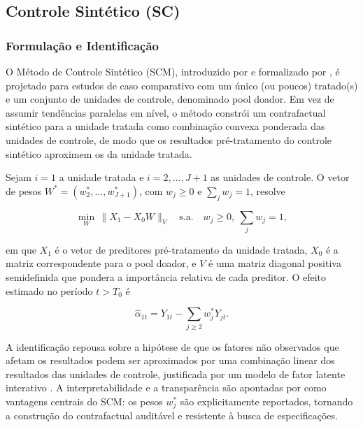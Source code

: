 \documentclass[a4paper,12pt]{article}
\begin{document}
\subsection{Controle Sintético (SC)}

\subsubsection{Formulação e Identificação}

O Método de Controle Sintético (SCM), introduzido por  e
formalizado por , é projetado para estudos de caso
comparativo com um único (ou poucos) tratado(s) e um conjunto de unidades de controle,
denominado pool doador. Em vez de assumir tendências paralelas em nível, o método constrói
um contrafactual sintético para a unidade tratada como combinação convexa ponderada das
unidades de controle, de modo que os resultados pré-tratamento do controle sintético
aproximem os da unidade tratada.

Sejam $i = 1$ a unidade tratada e $i = 2, \dots, J+1$ as unidades de controle. O vetor de
pesos $W^* = (w^*_2, \dots, w^*_{J+1})$, com $w_j \ge 0$ e $\sum_j w_j = 1$, resolve

\begin{equation}
\min_{W}\, \| X_1 - X_0 W \|_V \quad \text{s.a.} \quad w_j \geq 0,\ \sum_j w_j = 1,
\end{equation}

em que $X_1$ é o vetor de preditores pré-tratamento da unidade tratada, $X_0$ é a matriz
correspondente para o pool doador, e $V$ é uma matriz diagonal positiva
semidefinida que pondera a importância relativa de cada preditor. O efeito estimado no
período $t > T_0$ é

\begin{equation}
\hat{\alpha}_{1t} = Y_{1t} - \sum_{j \ge 2} w^*_j Y_{jt}.
\end{equation}

A identificação repousa sobre a hipótese de que os fatores não observados que afetam os
resultados podem ser aproximados por uma combinação linear dos resultados das unidades
de controle, justificada por um modelo de fator latente interativo \cite{abadie2021}. A
interpretabilidade e a transparência são apontadas por  como
vantagens centrais do SCM: os pesos $w^*_j$ são explicitamente reportados, tornando a
construção do contrafactual auditável e resistente à busca de especificações.
\end{document}
